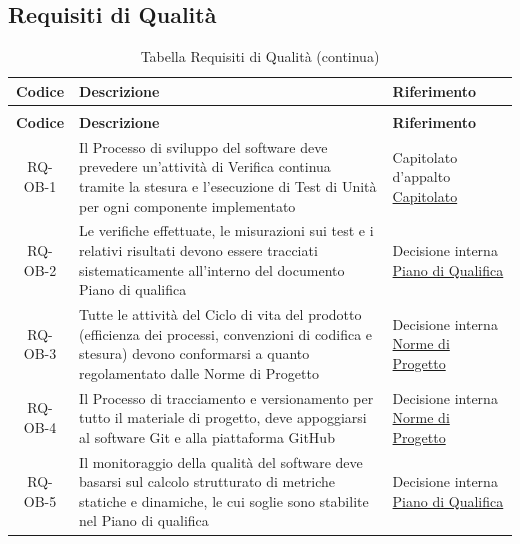 \documentclass[a4paper,12pt]{article}
\begin{document}

\subsection{Requisiti di Qualità} \label{subsection:requisiti_qualita}
\begin{center}
\renewcommand{\arraystretch}{1.5}
\begin{longtable}{|c|p{8.5cm}|>{\centering\arraybackslash}p{4cm}|}
\hline
\rowcolor{gray!60}
\textbf{Codice} & \textbf{Descrizione} & \textbf{Riferimento} \\
\hline
\endfirsthead
\caption[]{Tabella Requisiti di Qualità (continua)} \\
\hline
\rowcolor{gray!60}
\textbf{Codice} & \textbf{Descrizione} & \textbf{Riferimento} \\
\hline
\endhead
\rowcolor{white}
RQ-OB-1 & Il Processo di sviluppo del software deve prevedere un'attività di Verifica continua tramite la stesura e l'esecuzione di Test di Unità per ogni componente implementato & Capitolato d'appalto \href{https://www.math.unipd.it/~tullio/IS-1/2025/Progetto/C4.pdf}{Capitolato} \\
\hline
\rowcolor{gray!20}
RQ-OB-2 & Le verifiche effettuate, le misurazioni sui test e i relativi risultati devono essere tracciati sistematicamente all'interno del documento Piano di qualifica & Decisione interna \href{https://swe-bitbybit.github.io/SWE-docs/docs/RTB/documenti_esterni/piano_di_qualifica.pdf}{Piano di Qualifica} \\
\hline
\rowcolor{white}
RQ-OB-3 & Tutte le attività del Ciclo di vita del prodotto (efficienza dei processi, convenzioni di codifica e stesura) devono conformarsi a quanto regolamentato dalle Norme di Progetto & Decisione interna \href{https://swe-bitbybit.github.io/SWE-docs/docs/RTB/documenti_interni/norme_di_progetto.pdf}{Norme di Progetto} \\
\hline
\rowcolor{gray!20}
RQ-OB-4 & Il Processo di tracciamento e versionamento per tutto il materiale di progetto, deve appoggiarsi al software Git e alla piattaforma GitHub & Decisione interna \href{https://swe-bitbybit.github.io/SWE-docs/docs/RTB/documenti_interni/norme_di_progetto.pdf}{Norme di Progetto} \\
\hline
\rowcolor{white}
RQ-OB-5 & Il monitoraggio della qualità del software deve basarsi sul calcolo strutturato di metriche statiche e dinamiche, le cui soglie sono stabilite nel Piano di qualifica & Decisione interna \href{https://swe-bitbybit.github.io/SWE-docs/docs/RTB/documenti_esterni/piano_di_qualifica.pdf}{Piano di Qualifica} \\

\end{longtable}
\end{center}
\end{document}
